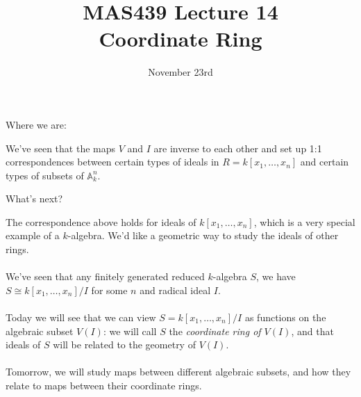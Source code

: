 \documentclass{beamer}
\title{MAS439 Lecture 14 \\ Coordinate Ring}
\date{November 23rd}
\newcommand{\AAA}{\mathbb{A}}
\begin{document}
\begin{frame}
\titlepage
\end{frame}


 \begin{frame}{Where we are:}

We've seen that the maps $V$ and $I$ are inverse to each other and set up 1:1 correspondences between certain types of ideals in $R=k[x_1,\dots, x_n]$ and certain types of subsets of $\AAA^n_k$.

\begin{center}
\end{center}


\end{frame}


\begin{frame}{What's next?}


The correspondence above holds for ideals of $k[x_1,\dots, x_n]$, which is a very special example of a $k$-algebra.  We'd like a geometric way to study the ideals of other rings. \\~\\

We've seen that any finitely generated reduced $k$-algebra $S$, we have $S\cong k[x_1,\dots, x_n]/I$ for some $n$ and radical ideal $I$.  \\~\\

Today we will see that we can view $S=k[x_1,\dots, x_n]/I$ as functions on the algebraic subset $V(I)$: we will call $S$ the \emph{coordinate ring of $V(I)$}, and that ideals of $S$ will be related to the geometry of $V(I)$.  \\~\\

Tomorrow, we will study maps between different algebraic subsets, and how they relate to maps between their coordinate rings.

\end{frame}
\end{document}
